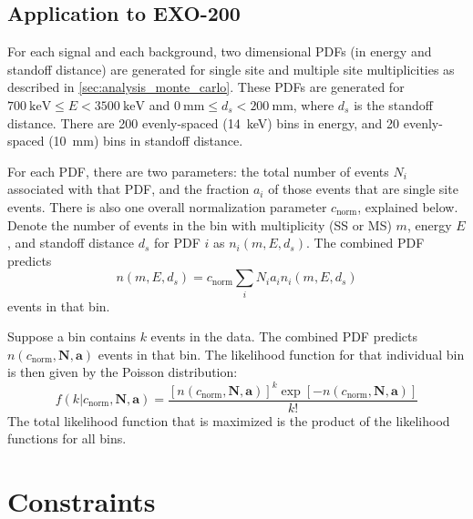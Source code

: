 \documentclass[herrin-thesis.tex]{subfiles}
\begin{document}
\subsection{Application to EXO-200}
\label{sec:analysis_fitting_exo200}
For each signal and each background, two dimensional PDFs (in energy and standoff distance) are generated for single site and multiple site multiplicities as described in \cref{sec:analysis_monte_carlo}. These PDFs are generated for \(\SI{700}{\keV} \leq E < \SI{3500}{\keV}\) and \(\SI{0}{\mm} \leq d_s < \SI{200}{\mm}\), where \(d_s\) is the standoff distance. There are 200 evenly-spaced (\SI{14}{\keV}) bins in energy, and 20 evenly-spaced (\SI{10}{\mm}) bins in standoff distance.

For each PDF, there are two parameters: the total number of events \(N_i\) associated with that PDF, and the fraction \(a_i\) of those events that are single site events. There is also one overall normalization parameter \(c_\text{norm}\), explained below. Denote the number of events in the bin with multiplicity (SS or MS) \(m\), energy \(E\), and standoff distance \(d_s\) for PDF \(i\) as \(n_i(m, E, d_s)\). The combined PDF predicts
\begin{equation}
n(m, E, d_s) = c_\text{norm}\sum_i N_i a_i n_i(m, E, d_s)
\label{eq:analysis_sum_pdf}
\end{equation}
events in that bin.

Suppose a bin contains \(k\) events in the data. The combined PDF predicts \(n(c_\text{norm}, \mathbf{N}, \mathbf{a})\) events in that bin. The likelihood function for that individual bin is then given by the Poisson distribution:
\begin{equation}
f(k|c_\text{norm}, \mathbf{N}, \mathbf{a}) = \frac{[n(c_\text{norm}, \mathbf{N}, \mathbf{a})]^k \exp[-n(c_\text{norm}, \mathbf{N}, \mathbf{a})]}{k!}
\end{equation}
The total likelihood function that is maximized is the product of the likelihood functions for all bins.

\section{Constraints}
\end{document}
